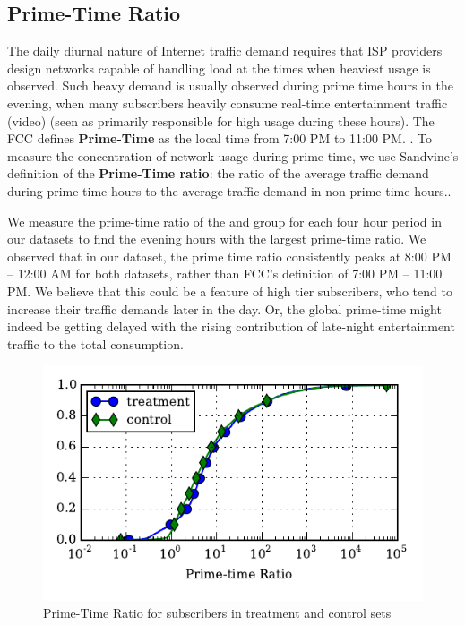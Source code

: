 \subsection{Prime-Time Ratio} \label{subsec:primetime}

The daily diurnal nature of Internet traffic demand requires that ISP providers 
design networks capable of handling load at the times when heaviest usage is 
observed. Such heavy demand is usually observed during prime time hours in the 
evening, when many
subscribers heavily consume real-time entertainment traffic (video) (seen as
primarily responsible for high usage during these hours). The FCC defines 
\textbf{Prime-Time} as the local time from 7:00 PM to 11:00 PM.
\cite{fcc2014measuring-broadband}. To measure the concentration of network usage
during prime-time, we use Sandvine's definition of the \textbf{Prime-Time 
ratio}: the
ratio of the average traffic demand during prime-time hours to the average 
traffic demand 
in non-prime-time hours.\cite{sandvine20141h, sandvine20142h}.

We measure the prime-time ratio of the \control{} and \treatment{} group
for each four hour period in our datasets to find the evening hours with
the largest prime-time ratio. We observed that in our dataset,
the prime time ratio consistently peaks at 8:00 PM -- 12:00 AM for both
datasets, rather than FCC's definition of 7:00 PM -- 11:00 PM. We believe that
this could be a feature of high tier subscribers, who tend to increase
their traffic demands later in the day. Or, the global prime-time might
indeed be getting delayed with the rising contribution of late-night 
entertainment
traffic to the total consumption.

\begin{figure}[t]
\begin{minipage}{\linewidth}
\centering
\includegraphics[]{figures/prime-time-ratio-per-device-cdf-MEAN.pdf}
\caption{Prime-Time Ratio for subscribers in treatment and control 
sets\label{fig:cdf-prime-time-ratio}}
\end{minipage}
\end{figure}

